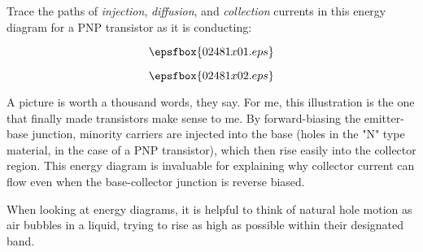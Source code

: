 

Trace the paths of {\it injection}, {\it diffusion}, and {\it collection} currents in this energy diagram for a PNP transistor as it is conducting:

$$\epsfbox{02481x01.eps}$$







$$\epsfbox{02481x02.eps}$$







A picture is worth a thousand words, they say.  For me, this illustration is the one that finally made transistors make sense to me.  By forward-biasing the emitter-base junction, minority carriers are injected into the base (holes in the "N" type material, in the case of a PNP transistor), which then rise easily into the collector region.  This energy diagram is invaluable for explaining why collector current can flow even when the base-collector junction is reverse biased.

When looking at energy diagrams, it is helpful to think of natural hole motion as air bubbles in a liquid, trying to rise as high as possible within their designated band.





